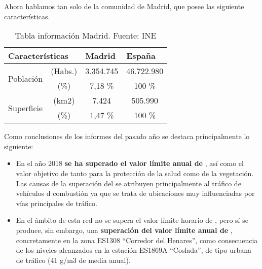  Ahora hablamos tan solo de la comunidad de Madrid, que posee las siguiente características.
 
 \begin{table}[H]
 		\begin{center}
 	\begin{tabular}{|c|c|c|c|}
 		\hline
 		\multicolumn{2}{|l|}{\textbf{Características}} & \multicolumn{1}{l|}{\textbf{Madrid}} & \multicolumn{1}{l|}{\textbf{España}} \\ \hline
 		\multirow{2}{*}{Población}       & (Habs.)     & 3.354.745                            & 46.722.980                           \\ \cline{2-4} 
 		& (\%)        & 7,18 \%                              & 100 \%                               \\ \hline
 		\multirow{2}{*}{Superficie}      & (km2)       & 7.424                                & 505.990                              \\ \cline{2-4} 
 		& (\%)        & 1,47 \%                              & 100 \%                               \\ \hline
 	\end{tabular}
 \caption{Tabla información Madrid. Fuente: INE \cite{informe_2018}}
 	\end{center}
 \end{table}
 
  Como conclusiones de los informes del pasado año se destaca principalmente lo siguiente:
 
 \begin{itemize}
 	\item En el año 2018 \textbf{se ha superado el valor límite anual de }, así como el valor objetivo de  tanto para la protección de la salud como de la vegetación.	Las causas de la superación del  se atribuyen principalmente al tráfico de vehículos d	combustión ya que se trata de ubicaciones muy influenciadas por vías principales de tráfico.
 	\item En el ámbito de esta red no se supera el valor límite horario de , pero sí se produce, sin embargo, una \textbf{superación del valor límite anual de }, concretamente en la zona ES1308 “Corredor del Henares”, como consecuencia de los niveles alcanzados en la estación ES1869A “Coslada”, de tipo urbana de tráfico (41 \textmugreek g/m3 de media anual).
 \end{itemize}


